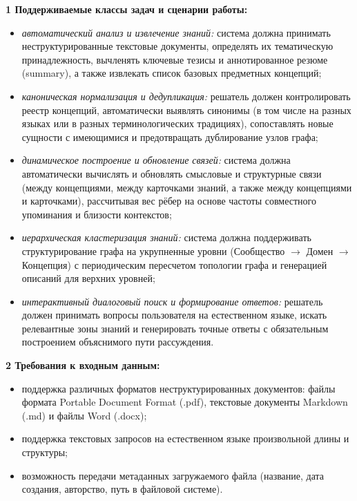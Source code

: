     \textbf{1 Поддерживаемые классы задач и сценарии работы:}
    \begin{itemize}
        \item \textit{автоматический анализ и извлечение знаний:} система должна принимать неструктурированные текстовые документы, определять их тематическую принадлежность, вычленять ключевые тезисы и аннотированное резюме (summary), а также извлекать список базовых предметных концепций;
        \item \textit{каноническая нормализация и дедупликация:} решатель должен контролировать реестр концепций, автоматически выявлять синонимы (в том числе на разных языках или в разных терминологических традициях), сопоставлять новые сущности с имеющимися и предотвращать дублирование узлов графа;
        \item \textit{динамическое построение и обновление связей:} система должна автоматически вычислять и обновлять смысловые и структурные связи (между концепциями, между карточками знаний, а также между концепциями и карточками), рассчитывая вес рёбер на основе частоты совместного упоминания и близости контекстов;
        \item \textit{иерархическая кластеризация знаний:} система должна поддерживать структурирование графа на укрупненные уровни (Сообщество $\rightarrow$ Домен $\rightarrow$ Концепция) с периодическим пересчетом топологии графа и генерацией описаний для верхних уровней;
        \item \textit{интерактивный диалоговый поиск и формирование ответов:} решатель должен принимать вопросы пользователя на естественном языке, искать релевантные зоны знаний и генерировать точные ответы с обязательным построением объяснимого пути рассуждения.
    \end{itemize}

    \textbf{2 Требования к входным данным:}
    \begin{itemize}
        \item поддержка различных форматов неструктурированных документов: файлы формата Portable Document Format (.pdf), текстовые документы Markdown (.md) и файлы Word (.docx);
        \item поддержка текстовых запросов на естественном языке произвольной длины и структуры;
        \item возможность передачи метаданных загружаемого файла (название, дата создания, авторство, путь в файловой системе).
    \end{itemize}

